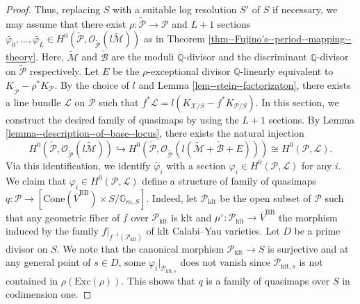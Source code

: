 \documentclass[12pt,twoside]{amsart}
\theoremstyle{definition}
\begin{document}
\begin{proof}
Thus, replacing $S$ with a suitable log resolution $S'$ of $S$ if necessary, we may assume that there exist $\rho\colon\tilde{\mathcal{P}}\to\mathcal{P}$ and $L+1$ sections $\widetilde{\varphi_0},\ldots,\widetilde{\varphi_L}\in H^0(\tilde{\mathcal{P}},\mathcal{O}_{\widetilde{\mathcal{P}}}(l\widetilde{\mathcal{M}}))$ as in Theorem \ref{thm--Fujino's--period--mapping--theory}.
Here, $\widetilde{\mathcal{M}}$ and $\widetilde{\mathcal{B}}$ are the moduli $\mathbb{Q}$-divisor and the discriminant $\mathbb{Q}$-divisor on $\tilde{\mathcal{P}}$ respectively.
Let $E$ be the $\rho$-exceptional divisor $\mathbb{Q}$-linearly equivalent to $K_{\widetilde{\mathcal{P}}}-\rho^*K_{\mathcal{P}}$. 
By the choice of $l$ and Lemma \ref{lem--stein--factorizaton}, there exists a line bundle $\mathscr{L}$ on $\mathcal{P}$ such that $f^*\mathscr{L}=l(K_{\mathcal{X}/S}-f^*K_{\mathcal{P}/S})$.
In this section, we construct the desired family of quasimaps by using the $L+1$ sections.
By Lemma \ref{lemma--description--of--base--locus}, there exists the natural injection
\begin{equation}\tag{$\clubsuit$}\label{eq--injection-of--function}
H^0(\tilde{\mathcal{P}},\mathcal{O}_{\widetilde{\mathcal{P}}}(l\widetilde{\mathcal{M}}))\hookrightarrow H^0(\tilde{\mathcal{P}},\mathcal{O}_{\widetilde{\mathcal{P}}}(l(\widetilde{\mathcal{M}}+\widetilde{\mathcal{B}}+E)))\cong H^0(\mathcal{P},\mathscr{L}).
\end{equation}
Via this identification, we identify $\widetilde{\varphi_i}$ with a section $\varphi_i\in H^0(\mathcal{P},\mathscr{L})$ for any $i$.
We claim that $\varphi_i\in H^0(\mathcal{P},\mathscr{L})$ define a structure of family of quasimaps $q\colon \mathcal{P}\to[\mathrm{Cone}(\overline{V}^{\mathrm{BB}})\times S/\mathbb{G}_{m,S}]$.
Indeed, let $\mathcal{P}_{\mathrm{klt}}$ be the open subset of $\mathcal{P}$ such that any geometric fiber of $f$ over $\mathcal{P}_{\mathrm{klt}}$ is klt and $\mu^\circ\colon \mathcal{P}_{\mathrm{klt}}\to \overline{V}^{\mathrm{BB}}$ the morphism induced by the family $f|_{f^{-1}(\mathcal{P}_{\mathrm{klt}})}$ of klt Calabi--Yau varieties.
Let $D$ be a prime divisor on $S$.
We note that the canonical morphism $\mathcal{P}_{\mathrm{klt}}\to S$ is surjective and at any general point of $s\in D$, some $\varphi_{i}|_{\mathcal{P}_{\mathrm{klt},s}}$ does not vanish since $\mathcal{P}_{\mathrm{klt},s}$ is not contained in $\rho(\mathrm{Exc}(\rho))$.
This shows that $q$ is a family of quasimaps over $S$ in codimension one.

\end{proof}
\end{document}
